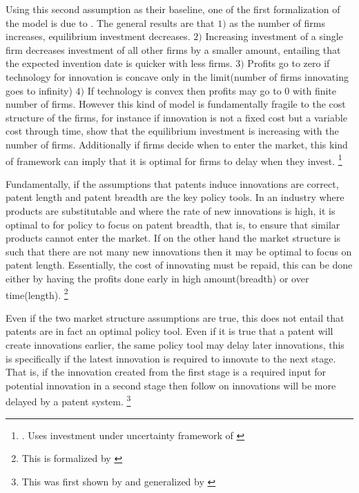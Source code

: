 \documentclass[12pt]{article}
\numberwithin{equation}{section}
\begin{document}
Using this second assumption as their baseline, one of the first formalization of the model is due to \cite{Loury1979}. The general results are that $1)$ as the number of firms increases, equilibrium investment decreases. $2)$ Increasing investment of a single firm decreases investment of all other firms by a smaller amount, entailing that the expected invention date is quicker with less firms. $3)$ Profits go to zero if technology for innovation is concave only in the limit(number of firms innovating goes to infinity) $4)$ If technology is convex then profits may go to 0 with finite number of firms. However this kind of model is fundamentally fragile to the cost structure of the firms, for instance if innovation is not a fixed cost but a variable cost through time, \cite{lee1980market} show that the equilibrium investment is increasing with the number of firms. Additionally if firms decide when to enter the market, this kind of framework can imply that it is optimal for firms to delay when they invest. \footnote{\cite{Weeds2002}. Uses investment under uncertainty framework of \cite{dixit1994investment}}

Fundamentally, if the assumptions that patents induce innovations are correct, patent length and patent breadth are the key policy tools. In an industry where products are substitutable and where the rate of new innovations is high, it is optimal to for policy to focus on patent breadth, that is, to ensure that similar products cannot enter the market. If on the other hand the market structure is such that there are not many new innovations then it may be optimal to focus on patent length. Essentially, the cost of innovating must be repaid, this can be done either by having the profits done early in high amount(breadth) or over time(length). \footnote{This is formalized by \cite{takalo2001optimal}}

Even if the two market structure assumptions are true, this does not entail that patents are in fact an optimal policy tool. Even if it is true that a patent will create innovations earlier, the same policy tool may delay later innovations, this is specifically if the latest innovation is required to innovate to the next stage. That is, if the innovation created from the first stage is a required input for potential innovation in a second stage then follow on innovations will be more delayed by a patent system. \footnote{This was first shown by \cite{bessen_maskin} and generalized by \cite{Bryan2017}}
\end{document}
